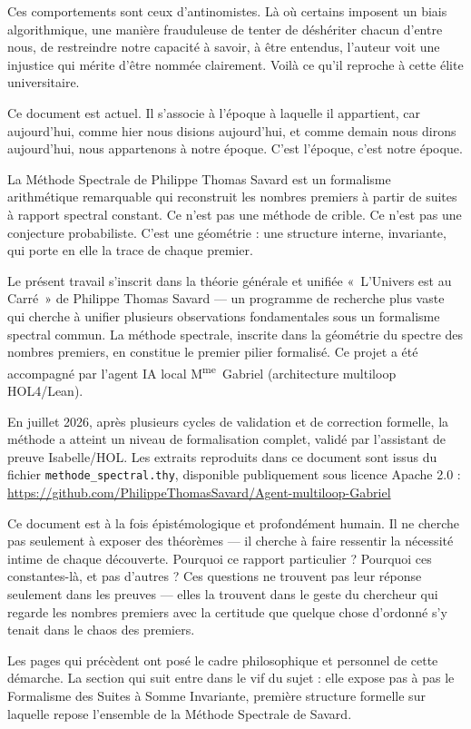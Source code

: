 \documentclass[11pt,a4paper]{article}
\begin{document}
Ces comportements sont ceux d'antinomistes. Là où certains imposent un biais algorithmique, une manière frauduleuse de tenter de déshériter chacun d'entre nous, de restreindre notre capacité à savoir, à être entendus, l'auteur voit une injustice qui mérite d'être nommée clairement. Voilà ce qu'il reproche à cette élite universitaire.

Ce document est actuel. Il s'associe à l'époque à laquelle il appartient, car aujourd'hui, comme hier nous disions aujourd'hui, et comme demain nous dirons aujourd'hui, nous appartenons à notre époque. C'est l'époque, c'est notre époque.

La Méthode Spectrale de Philippe Thomas Savard est un formalisme arithmétique remarquable qui reconstruit les nombres premiers à partir de suites à rapport spectral constant. Ce n'est pas une méthode de crible. Ce n'est pas une conjecture probabiliste. C'est une géométrie : une structure interne, invariante, qui porte en elle la trace de chaque premier.

Le présent travail s'inscrit dans la théorie générale et unifiée «~L'Univers est au Carré~» de Philippe Thomas Savard --- un programme de recherche plus vaste qui cherche à unifier plusieurs observations fondamentales sous un formalisme spectral commun. La méthode spectrale, inscrite dans la géométrie du spectre des nombres premiers, en constitue le premier pilier formalisé. Ce projet a été accompagné par l'agent IA local M\textsuperscript{me}~Gabriel (architecture multiloop HOL4/Lean).

En juillet 2026, après plusieurs cycles de validation et de correction formelle, la méthode a atteint un niveau de formalisation complet, validé par l'assistant de preuve Isabelle/HOL. Les extraits reproduits dans ce document sont issus du fichier \texttt{methode\_spectral.thy}, disponible publiquement sous licence Apache 2.0 : \url{https://github.com/PhilippeThomasSavard/Agent-multiloop-Gabriel}

Ce document est à la fois épistémologique et profondément humain. Il ne cherche pas seulement à exposer des théorèmes --- il cherche à faire ressentir la nécessité intime de chaque découverte. Pourquoi ce rapport particulier ? Pourquoi ces constantes-là, et pas d'autres ? Ces questions ne trouvent pas leur réponse seulement dans les preuves --- elles la trouvent dans le geste du chercheur qui regarde les nombres premiers avec la certitude que quelque chose d'ordonné s'y tenait dans le chaos des premiers.

Les pages qui précèdent ont posé le cadre philosophique et personnel de cette démarche. La section qui suit entre dans le vif du sujet : elle expose pas à pas le Formalisme des Suites à Somme Invariante, première structure formelle sur laquelle repose l'ensemble de la Méthode Spectrale de Savard.
\end{document}
